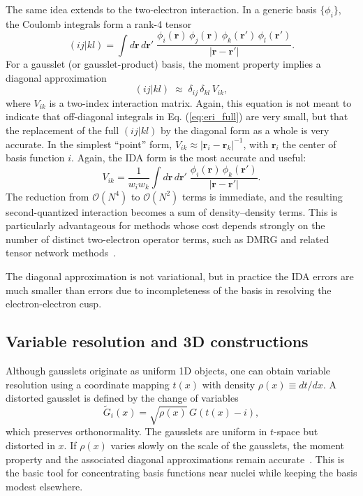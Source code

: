 \documentclass[aps,pra,reprint,longbibliography,nofootinbib]{revtex4-2}
\begin{document}
The same idea extends to the two-electron interaction.  In a generic basis $\{\phi_i\}$, the Coulomb
integrals form a rank-4 tensor
\begin{equation}
  (ij|kl) = \int d\mathbf{r}\, d\mathbf{r}'\;
  \frac{\phi_i(\mathbf{r})\,\phi_j(\mathbf{r})\,
        \phi_k(\mathbf{r}')\,\phi_l(\mathbf{r}')}{|\mathbf{r}-\mathbf{r}'|}.
  \label{eq:eri_full}
\end{equation}
For a gausslet (or gausslet-product) basis, the moment property implies a diagonal approximation
\begin{equation}
  (ij|kl) \;\approx\; \delta_{ij}\,\delta_{kl}\,V_{ik},
  \label{eq:eri_diag}
\end{equation}
where $V_{ik}$ is a two-index interaction matrix. Again, this equation is not meant to indicate that off-diagonal integrals in Eq. (\ref{eq:eri_full}) are very small, but that the replacement of the full $(ij|kl)$ by the diagonal form as a whole is very accurate. In the simplest ``point'' form,
$V_{ik}\approx |\mathbf{r}_i-\mathbf{r}_k|^{-1}$, with $\mathbf{r}_i$ the center of basis function $i$.
Again, the IDA form is the most accurate and useful:
\begin{equation}
 V_{ik} = \frac{1}{w_i w_k} \int d\mathbf{r}\, d\mathbf{r}'\;
  \frac{\phi_i(\mathbf{r})\,
        \phi_k(\mathbf{r}')}{|\mathbf{r}-\mathbf{r}'|}.
  \label{eq:ida_diag}
\end{equation}
The reduction from $\mathcal{O}(N^4)$ to $\mathcal{O}(N^2)$ terms is
immediate, and the resulting second-quantized interaction becomes a sum of density--density terms.
This is particularly advantageous for methods whose cost depends strongly on the number of distinct
two-electron operator terms, such as DMRG and related tensor network methods~\cite{White17,WhiteStoudenmire2019MultiSliced}.

The diagonal approximation is not variational, but in practice the IDA errors are much smaller than errors due to incompleteness of the basis in resolving the electron-electron cusp.

\subsection{Variable resolution and 3D constructions}

Although gausslets originate as uniform 1D objects, one can obtain variable resolution using a
coordinate mapping $t(x)$ with density $\rho(x)\equiv dt/dx$.
A distorted gausslet is defined by the change of variables
\begin{equation}
  \tilde G_i(x) = \sqrt{\rho(x)}\,G\!\left(t(x)-i\right),
  \label{eq:distorted_gausslet}
\end{equation}
which preserves orthonormality. The gausslets are uniform in $t$-space but distorted in $x$. If $\rho(x)$ varies slowly on the scale of the gausslets, the
moment property and the associated diagonal approximations remain accurate~\cite{WhiteStoudenmire2019MultiSliced,White2023}.
This is the basic tool for concentrating basis functions near nuclei while keeping the basis modest
elsewhere.
\end{document}
